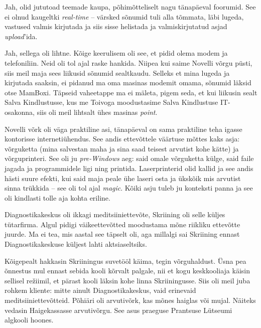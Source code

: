 
Jah, olid jututoad teemade kaupa, põhimõtteliselt nagu tänapäeval foorumid. 
See ei olnud kaugeltki \emph{real-time} -- värsked sõnumid tuli alla tõmmata, läbi lugeda, vastused valmis kirjutada ja siis sisse helistada ja valmiskirjutatud asjad \emph{upload}'ida. 


Jah, sellega oli lihtne. Kõige keerulisem oli see, et pidid olema modem ja 
telefoniliin. Neid oli tol ajal raske hankida. 
Niipea kui saime Novelli võrgu püsti, siis meil maja sees liikusid 
sõnumid sealtkaudu. Selleks et mina lugeda ja kirjutada saaksin, ei pidanud ma 
oma masinas modemit omama, sõnumid läksid otse MamBoxi. Täpseid vaheetappe ma ei mäleta, pigem seda, et kui liikusin 
sealt Salva Kindlustusse, kus me Toivoga moodustasime Salva Kindlustuse IT-osakonna, 
siis oli meil lihtsalt ühes masinas \emph{point}. 


Novelli võrk oli väga praktiline asi, tänapäeval on sama praktiline 
teha igasse kontorisse internetiühendus. See andis ettevõttele väärtuse 
mõttes kaks asja: võrguketta (mina salvestan maha ja sina saad teisest 
arvutist kohe kätte) ja võrguprinteri. See oli ju \emph{pre-Windows} aeg: 
said omale võrguketta külge, said faile jagada ja programmidele ligi ning 
printida. Laserprinterid olid kallid ja see andis hästi suure efekti, kui
said maja peale ühe laseri osta ja ükskõik mis arvutist sinna trükkida -- see oli 
tol ajal \emph{magic}. Kõiki asju tuleb ju konteksti panna ja see oli kindlasti tolle aja kohta eriline. 


Diagnostikakeskus oli 
ikkagi meditsiiniettevõte, Skriining oli selle küljes 
tütarfirma. Algul pidigi väikeettevõtted moodustama mõne
riikliku ettevõtte juurde. Ma ei tea, mis aastal see täpselt oli, aga 
millalgi sai Skriining ennast Diagnostikakeskuse küljest lahti aktsiaseltsiks. 

Kõigepealt hakkasin Skriiningus suvetööl käima, tegin võrguhaldust. Üsna pea 
õnnestus mul ennast sebida kooli kõrvalt palgale, nii et kogu keskkooliaja 
käisin sellisel režiimil, et pärast kooli läksin kohe linna 
Skriiningusse. Siis oli meil juba rohkem kliente: mitte ainult 
Diagnostikakeskus, vaid erinevaid meditsiiniettevõtteid. Põhiäri oli arvutivõrk, kas mõnes haiglas või mujal. Näiteks vedasin
Haigekassasse arvutivõrgu. See asus praeguse Prantsuse Lütseumi 
algkooli hoones. 


